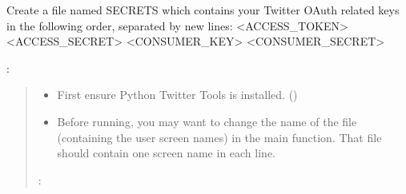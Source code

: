 \documentclass[letterpaper,10pt,english]{sphinxmanual}
\begin{document}
Create a file named SECRETS which contains your Twitter OAuth related keys in the following order, separated by new lines:
\textless{}ACCESS\_TOKEN\textgreater{}
\textless{}ACCESS\_SECRET\textgreater{}
\textless{}CONSUMER\_KEY\textgreater{}
\textless{}CONSUMER\_SECRET\textgreater{}

:
\begin{quote}
\begin{itemize}
\item {} 
First ensure Python Twitter Tools is installed. ()

\item {} 
Before running, you may want to change the name of the file (containing the user screen names)
in the main function. That file should contain one screen name in each line.

\end{itemize}

:
\end{quote}
\end{document}
